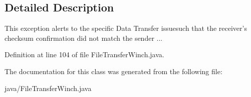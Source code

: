 \subsection{Detailed Description}
This exception alerts to the specific Data Transfer issuesuch that the receiver's checksum confirmation did not match the sender ... 



Definition at line 104 of file File\+Transfer\+Winch.\+java.



The documentation for this class was generated from the following file\+:\begin{DoxyCompactItemize}
\item 
java/File\+Transfer\+Winch.\+java\end{DoxyCompactItemize}

